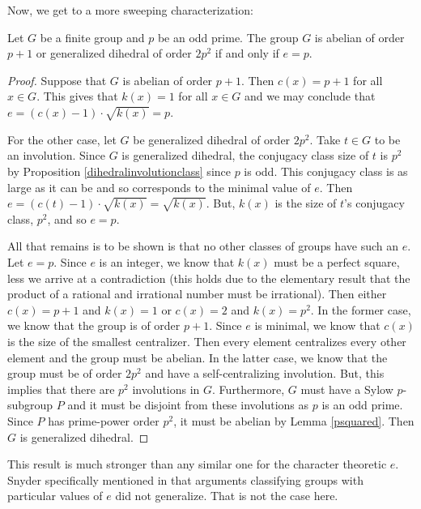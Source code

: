 \documentclass[main.tex]{subfiles}
\begin{document}
Now, we get to a more sweeping characterization:

\begin{theorem}\label{eprime}
Let $G$ be a finite group and $p$ be an odd prime. The group $G$ is abelian of order $p+1$ or generalized dihedral of order $2p^2$ if and only if $e = p$.
\end{theorem}

\begin{proof}
Suppose that $G$ is abelian of order $p+1$. Then $c(x) = p+1$ for all $x \in G$. This gives that $k(x) = 1$ for all $x \in G$ and we may conclude that $e = (c(x) - 1) \cdot \sqrt{k(x)} = p$.

For the other case, let $G$ be generalized dihedral of order $2p^2$. Take $t \in G$ to be an involution. Since $G$ is generalized dihedral, the conjugacy class size of $t$ is $p^2$ by Proposition \ref{dihedralinvolutionclass} since $p$ is odd. This conjugacy class is as large as it can be and so corresponds to the minimal value of $e$. Then $e = (c(t) - 1) \cdot \sqrt{k(x)} = \sqrt{k(x)}$. But, $k(x)$ is the size of $t$'s conjugacy class, $p^2$, and so $e = p$.

All that remains is to be shown is that no other classes of groups have such an $e$. Let $e = p$. Since $e$ is an integer, we know that $k(x)$ must be a perfect square, less we arrive at a contradiction (this holds due to the elementary result that the product of a rational and irrational number must be irrational). Then either $c(x) = p+1$ and $k(x) = 1$ or $c(x) = 2$ and $k(x) = p^2$. In the former case, we know that the group is of order $p+1$. Since $e$ is minimal, we know that $c(x)$ is the size of the smallest centralizer. Then every element centralizes every other element and the group must be abelian. In the latter case, we know that the group must be of order $2p^2$ and have a self-centralizing involution. But, this implies that there are $p^2$ involutions in $G$. Furthermore, $G$ must have a Sylow $p$-subgroup $P$ and it must be disjoint from these involutions as $p$ is an odd prime. Since $P$ has prime-power order $p^2$, it must be abelian by Lemma \ref{psquared}. Then $G$ is generalized dihedral.
\end{proof}

This result is much stronger than any similar one for the character theoretic $e$. Snyder specifically mentioned in \cite{snyderarticle} that arguments classifying groups with particular values of $e$ did not generalize. That is not the case here.
\end{document}
